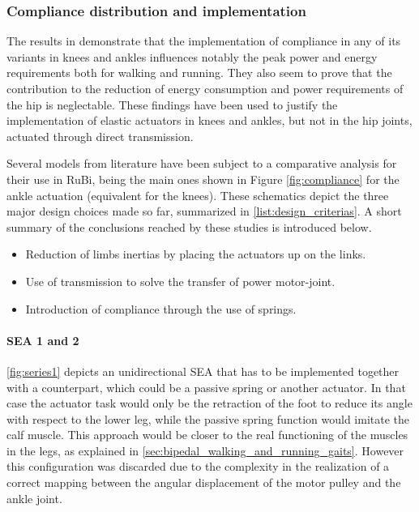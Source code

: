 
\subsubsection{Compliance distribution and implementation} %
\label{ssub:compliance_distribution_and_possible_configurations}
The results in \cite{grimmer} demonstrate that the implementation of compliance in any of its variants in knees and ankles influences notably the peak power and energy requirements both for walking and running.
They also seem to prove that the contribution to the reduction of energy consumption and power requirements of the hip is neglectable.
These findings have been used to justify the implementation of elastic actuators in knees and ankles, but not in the hip joints, actuated through direct transmission.

Several models from literature have been subject to a comparative analysis for their use in RuBi, being the main ones shown in Figure \ref{fig:compliance} for the ankle actuation (equivalent for the knees).
These schematics depict the three major design choices made so far, summarized in \ref{list:design_criterias}.
A short summary of the conclusions reached by these studies is introduced below.

\begin{itemize}
\label{list:design_criterias}
  \item Reduction of limbs inertias by placing the actuators up on the links.
  \item Use of transmission to solve the transfer of power motor-joint.
  \item Introduction of compliance through the use of springs.
\end{itemize}

\paragraph{SEA 1 and 2} %
\label{par:sea_1_2}
\ref{fig:series1} depicts an unidirectional SEA that has to be implemented together with a counterpart, which could be a passive spring or another actuator.
In that case the actuator task would only be the retraction of the foot to reduce its angle with respect to the lower leg, while the passive spring function would imitate the calf muscle.
This approach would be closer to the real functioning of the muscles in the legs, as explained in \ref{sec:bipedal_walking_and_running_gaits}.
However this configuration was discarded due to the complexity in the realization of a correct mapping between the angular displacement of the motor pulley and the ankle joint.

